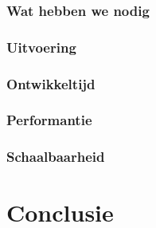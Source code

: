 \subsubsection{Wat hebben we nodig}


\subsubsection{Uitvoering}



\subsubsection{Ontwikkeltijd}



\subsubsection{Performantie}



\subsubsection{Schaalbaarheid}




\section{Conclusie}























